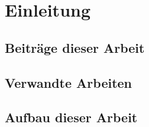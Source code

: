 \documentclass[german,version-2022-01]{uzl-thesis}
\begin{document}
%
%


\chapter{Einleitung}


%


\section{Beitr\"age dieser Arbeit}

%


\section{Verwandte Arbeiten}

%


\section{Aufbau dieser Arbeit}
\end{document}
